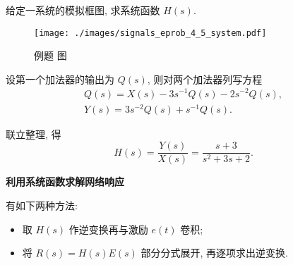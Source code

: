 \begin{exampleprob}
    给定一系统的模拟框图, 求系统函数 $H(s)$.
    \begin{figure}[H]
        \centering
        \texttt{[image: ./images/signals\_eprob\_4\_5\_system.pdf]}
        \caption{例题 \theexampleprob 图}
    \end{figure}

    \begin{solution}
        设第一个加法器的输出为 $Q(s)$, 则对两个加法器列写方程
        \begin{gather*}
            Q(s)=X(s)-3s^{-1}Q(s)-2s^{-2}Q(s), \\
            Y(s)=3s^{-2}Q(s)+s^{-1}Q(s).
        \end{gather*}

        联立整理, 得
        \begin{equation*}
            H(s)=\frac{Y(s)}{X(s)}=\frac{s+3}{s^2+3s+2}.
        \end{equation*}
    \end{solution}
\end{exampleprob}

\textbf{利用系统函数求解网络响应}

有如下两种方法:
\begin{itemize}
    \item 取 $H(s)$ 作逆变换再与激励 $e(t)$ 卷积;
    \item 将 $R(s)=H(s)E(s)$ 部分分式展开, 再逐项求出逆变换.
\end{itemize}
